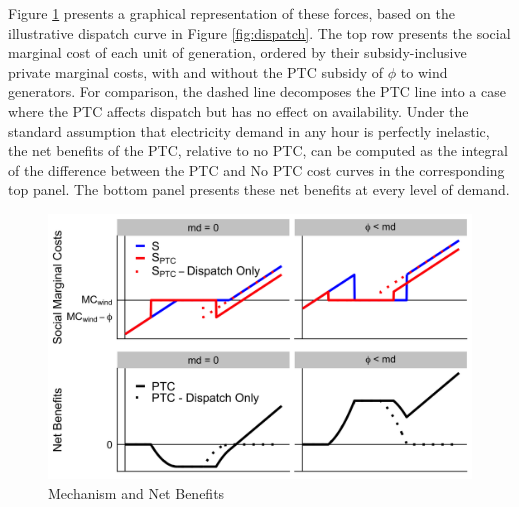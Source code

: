 \documentclass[12pt]{article}
\begin{document}
Figure \ref{fig:mechanism_welfare} presents a graphical representation of these forces, based on the illustrative dispatch curve in Figure \ref{fig:dispatch}. The top row presents the social marginal cost of each unit of generation, ordered by their subsidy-inclusive private marginal costs, with and without the PTC subsidy of $\phi$ to wind generators. For comparison, the dashed line decomposes the PTC line into a case where the PTC affects dispatch but has no effect on availability. Under the standard assumption that electricity demand in any hour is perfectly inelastic, the net benefits of the PTC, relative to no PTC, can be computed as the integral of the difference between the PTC and No PTC cost curves in the corresponding top panel. The bottom panel presents these net benefits at every level of demand.

\begin{figure}[h] 
\begin{center}
\caption{Mechanism and Net Benefits \label{fig:mechanism_welfare}}
\includegraphics[width=0.85\linewidth]{net_benefits.png}
\end{center}
\end{figure}
\end{document}
